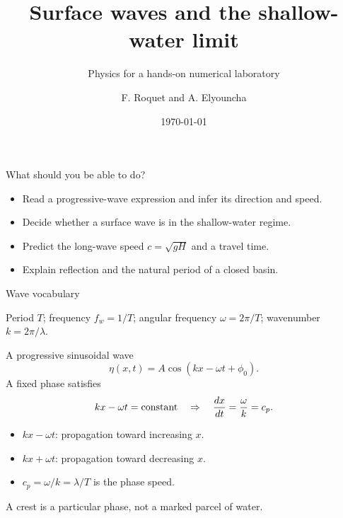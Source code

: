 \documentclass[aspectratio=169]{beamer}
\title[Shallow-water waves]{Surface waves and the shallow-water limit}
\subtitle{Physics for a hands-on numerical laboratory}
\author{F. Roquet and A. Elyouncha}
\date{\today}
\begin{document}
\begin{frame}
  \titlepage
\end{frame}

\begin{frame}{What should you be able to do?}
  \begin{itemize}
    \item Read a progressive-wave expression and infer its direction and speed.
    \item Decide whether a surface wave is in the shallow-water regime.
    \item Predict the long-wave speed $c=\sqrt{gH}$ and a travel time.
    \item Explain reflection and the natural period of a closed basin.
  \end{itemize}
\end{frame}

\begin{frame}{Wave vocabulary}
  \centering
  \vfill
  Period $T$; frequency $f_w=1/T$; angular frequency $\omega=2\pi/T$;
  wavenumber $k=2\pi/\lambda$.
\end{frame}

\begin{frame}{A progressive sinusoidal wave}
  \[
    \eta(x,t)=A\cos(kx-\omega t+\phi_0).
  \]
  A fixed phase satisfies
  \[
    kx-\omega t=\hbox{constant}
    \quad\Rightarrow\quad
    \frac{dx}{dt}=\frac{\omega}{k}=c_p.
  \]
  \begin{itemize}
    \item $kx-\omega t$: propagation toward increasing $x$.
    \item $kx+\omega t$: propagation toward decreasing $x$.
    \item $c_p=\omega/k=\lambda/T$ is the phase speed.
  \end{itemize}
  A crest is a particular phase, not a marked parcel of water.
\end{frame}
\end{document}

